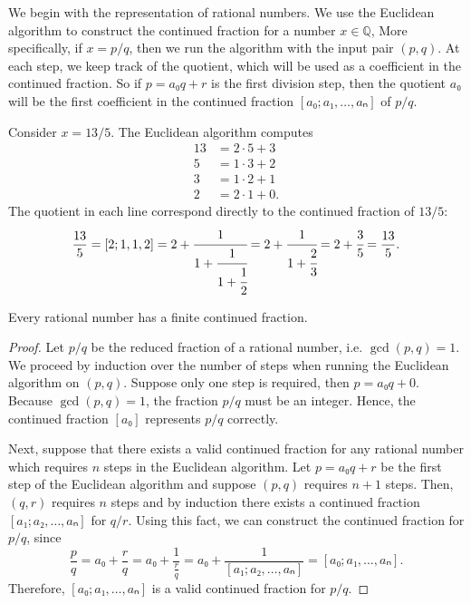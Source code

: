 We begin with the representation of rational numbers.
We use the Euclidean algorithm to construct the continued fraction for a number $x ∈ ℚ$,
More specifically, if $x = p/q$, then we run the algorithm with the input pair $(p, q)$.
At each step, we keep track of the quotient,
which will be used as a coefficient in the continued fraction.
So if $p = a₀q + r$ is the first division step, then the quotient $a₀$ will be
the first coefficient in the continued fraction $[a₀; a₁, …, aₙ]$ of $p/q$.

\begin{example}
  Consider $x = 13/5$.
  The Euclidean algorithm computes
  \begin{align*}
    13 & = 2 · 5 + 3 \\
     5 & = 1 · 3 + 2 \\
     3 & = 1 · 2 + 1 \\
     2 & = 2 · 1 + 0.
  \end{align*}
  The quotient in each line correspond directly to the continued fraction of $13/5$:
  \[
    \frac{13}{5}
    = [2; 1, 1, 2]
    = 2 + \cfrac{1}{1 + \cfrac{1}{1 + \cfrac{1}{2}}}
    = 2 + \cfrac{1}{1 + \cfrac{2}{3}}
    = 2 + \cfrac{3}{5}
    = \frac{13}{5}.
  \]
\end{example}

\begin{lemma}
  \label{lem:cf-rat}
  Every rational number has a finite continued fraction.
\end{lemma}

\begin{proof}
  Let $p/q$ be the reduced fraction of a rational number, i.e. $\gcd(p, q) = 1$.
  We proceed by induction over the number of steps when running the
  Euclidean algorithm on $(p, q)$.
  Suppose only one step is required, then $p = a₀ q + 0$.
  Because $\gcd(p, q) = 1$, the fraction $p/q$ must be an integer.
  Hence, the continued fraction $[a₀]$ represents $p/q$ correctly.

  Next, suppose that there exists a valid continued fraction for any rational
  number which requires $n$ steps in the Euclidean algorithm.
  Let $p = a₀ q + r$ be the first step of the Euclidean algorithm
  and suppose $(p, q)$ requires $n+1$ steps.
  Then, $(q, r)$ requires $n$ steps and by induction there exists a continued
  fraction $[a₁; a₂, …, aₙ]$ for $q/r$.
  Using this fact, we can construct the continued fraction for $p/q$, since
  \[
    \frac{p}{q}
    = a₀ + \frac{r}{q}
    = a₀ + \frac{1}{\frac{r}{q}}
    = a₀ + \frac{1}{[a₁; a₂, …, aₙ]}
    = [a₀; a₁, …, aₙ].
  \]
  Therefore, $[a₀; a₁, …, aₙ]$ is a valid continued fraction for $p/q$.
\end{proof}

